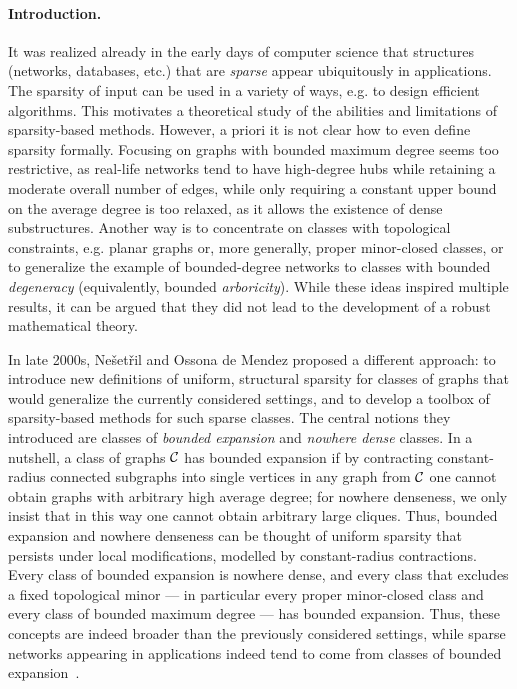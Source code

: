 \paragraph*{Introduction.}
It was realized already in the early days of computer science that structures (networks, databases, etc.) that are {\em{sparse}} appear ubiquitously in applications.
The sparsity of input can be used in a variety of ways, e.g. to design efficient algorithms. This motivates a theoretical study of the abilities and limitations of sparsity-based methods.
However, a priori it is not clear how to even define sparsity formally.
Focusing on graphs with bounded maximum degree seems too restrictive, as real-life networks tend to have high-degree hubs while retaining a moderate overall number of edges,
while only requiring a constant upper bound on the average degree is too relaxed, as it allows the existence of dense substructures.
Another way is to concentrate on classes with topological constraints, e.g. planar graphs or, more generally, proper minor-closed classes,
or to generalize the example of bounded-degree networks to classes with bounded {\em{degeneracy}} (equivalently, bounded {\em{arboricity}}).
While these ideas inspired multiple results, it can be argued that they did not lead to the development of a robust mathematical theory.

In late 2000s, Ne\v{s}et\v{r}il and Ossona de Mendez proposed a different approach:
to introduce new definitions of uniform, structural sparsity for classes of graphs that would generalize the currently considered settings,
and to develop a toolbox of sparsity-based methods for such sparse classes.
The central notions they introduced are classes of {\em{bounded expansion}} and {\em{nowhere dense}} classes.
In a nutshell, a class of graphs $\mathcal{C}$ has bounded expansion if by contracting constant-radius connected subgraphs into single vertices
in any graph from $\mathcal{C}$ one cannot obtain graphs with arbitrary high average degree; for nowhere denseness, we only insist that in this way one cannot obtain arbitrary large cliques.
Thus, bounded expansion and nowhere denseness can be thought of uniform sparsity that persists under local modifications, modelled by constant-radius contractions.
Every class of bounded expansion is nowhere dense, and every class that excludes a fixed topological minor --- in particular every proper minor-closed class and every class of bounded maximum degree ---
has bounded expansion. Thus, these concepts are indeed broader than the previously considered settings, while sparse networks appearing in applications indeed tend to come from
classes of bounded expansion~\cite{DemaineRRVSS14}.


